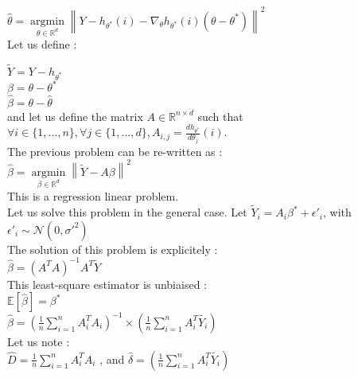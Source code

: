 \documentclass{article}
\begin{document}
$ \hat{\theta} =  \underset{\theta \in \mathbb{R}^d}{\operatorname{argmin}}  \left\lVert Y - h_{\theta ^* } (i ) - \nabla_\theta h_{\theta^*}(i) (\theta - \theta^*) \right\rVert ^2 $\\


Let us define : 

$ \tilde{Y} = Y - h_{\theta ^* }$\\

$\beta = \theta - \theta ^* $\\ 

$\hat{\beta} = \theta - \hat{\theta} $\\

and let us define the matrix $A \in \mathbb{R} ^{n \times d }$ such that  $\forall i \in \{ 1, ..., n\}, \forall j \in \{1, ..., d\}, A_{i, j} = \frac{dh_{\theta^*}}{d\theta_j}(i)$.\\


The previous problem can be re-written as : \\


$ \hat{\beta} =  \underset{\beta \in \mathbb{R}^d}{\operatorname{argmin}}  \left\lVert \tilde{Y} - A \beta \right\rVert ^2 $\\


This is a regression linear problem. \\

Let us solve this problem in the general case. Let  $\tilde{Y}_i = A_i \beta ^* + \epsilon ' _i $, with  $\epsilon ' _i \sim \mathcal{N}(0, \sigma ' ^2)$\\


The solution of this problem is explicitely : \\


$\hat{\beta } = (A^T A ) ^{-1} A^T \tilde{Y}$ \\


This least-square estimator is unbiaised : \\

$\mathbb{E}[\hat{\beta}] = \beta ^*$\\

$\hat {\beta } = (\frac{1}{n} \sum_{i=1}^{n}   A_i ^T A_i ) ^{-1}    \times (\frac{1}{n} \sum_{i=1}^{n} A_i ^T \tilde{Y_i })$\\


Let us note : \\

$\hat{D}  = \frac{1}{n} \sum_{i=1}^{n}   A_i ^T A_i $ , and $\hat{\delta}  = (\frac{1}{n} \sum_{i=1}^{n} A_i ^T \tilde{Y_i }) $\\
\end{document}
